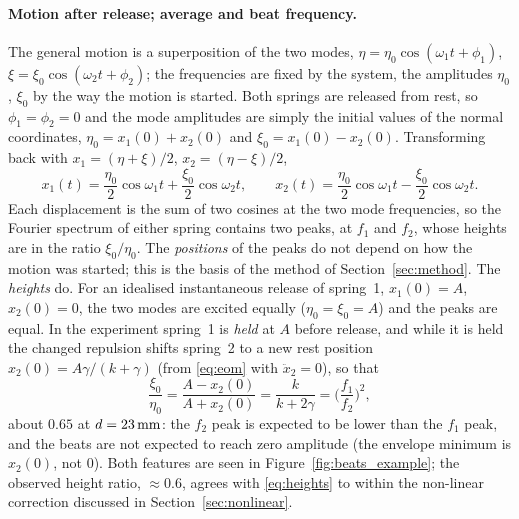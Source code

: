 \paragraph{Motion after release; average and beat frequency.} The general motion is a superposition of the two modes, $\eta=\eta_0\cos(\omega_1t+\phi_1)$, $\xi=\xi_0\cos(\omega_2t+\phi_2)$; the frequencies are fixed by the system, the amplitudes $\eta_0$, $\xi_0$ by the way the motion is started. Both springs are released from rest, so $\phi_1=\phi_2=0$ and the mode amplitudes are simply the initial values of the normal coordinates, $\eta_0=x_1(0)+x_2(0)$ and $\xi_0=x_1(0)-x_2(0)$. Transforming back with $x_1=(\eta+\xi)/2$, $x_2=(\eta-\xi)/2$,
\begin{equation}
x_1(t)=\frac{\eta_0}{2}\cos\omega_1t+\frac{\xi_0}{2}\cos\omega_2t,\qquad
x_2(t)=\frac{\eta_0}{2}\cos\omega_1t-\frac{\xi_0}{2}\cos\omega_2t .
\label{eq:solution}
\end{equation}
Each displacement is the sum of two cosines at the two mode frequencies, so the Fourier spectrum of either spring contains two peaks, at $f_1$ and $f_2$, whose heights are in the ratio $\xi_0/\eta_0$. The \emph{positions} of the peaks do not depend on how the motion was started; this is the basis of the method of Section~\ref{sec:method}. The \emph{heights} do. For an idealised instantaneous release of spring~1, $x_1(0)=A$, $x_2(0)=0$, the two modes are excited equally ($\eta_0=\xi_0=A$) and the peaks are equal. In the experiment spring~1 is \emph{held} at $A$ before release, and while it is held the changed repulsion shifts spring~2 to a new rest position $x_2(0)=A\gamma/(k+\gamma)$ (from \eqref{eq:eom} with $\ddot x_2=0$), so that
\begin{equation}
\frac{\xi_0}{\eta_0}=\frac{A-x_2(0)}{A+x_2(0)}=\frac{k}{k+2\gamma}=\Big(\frac{f_1}{f_2}\Big)^2 ,
\label{eq:heights}
\end{equation}
about $0.65$ at $d=23\,\mathrm{mm}$: the $f_2$ peak is expected to be lower than the $f_1$ peak, and the beats are not expected to reach zero amplitude (the envelope minimum is $x_2(0)$, not $0$). Both features are seen in Figure~\ref{fig:beats_example}; the observed height ratio, $\approx0.6$, agrees with \eqref{eq:heights} to within the non-linear correction discussed in Section~\ref{sec:nonlinear}.

